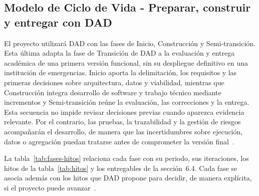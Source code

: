 
\subsection{Modelo de Ciclo de Vida - Preparar, construir y entregar con DAD}\label{sec:spmp-8-1}
El proyecto utilizará DAD con las fases de Inicio, Construcción y Semi-transición. Esta última adapta la fase de Transición de DAD a la evaluación y entrega académica de una primera versión funcional, sin su despliegue definitivo en una institución de emergencias. Inicio aporta la delimitación, los requisitos y las primeras decisiones sobre arquitectura, datos y viabilidad, mientras que Construcción integra desarrollo de software y trabajo técnico mediante incrementos y Semi-transición reúne la evaluación, las correcciones y la entrega. Esta secuencia no impide revisar decisiones previas cuando aparezca evidencia relevante. Por el contrario, las pruebas, la trazabilidad y la gestión de riesgos acompañarán el desarrollo, de manera que las incertidumbres sobre ejecución, datos o agregación puedan tratarse antes de comprometer la versión final~\cite{adaptacion2026}.

La tabla~\ref{tab:fases-hitos} relaciona cada fase con su periodo, sus iteraciones, los hitos de la tabla~\ref{tab:hitos} y los entregables de la sección~6.4. Cada fase se asocia además con los hitos que DAD propone para decidir, de manera explícita, si el proyecto puede avanzar~\cite{ambler2012dad}.

